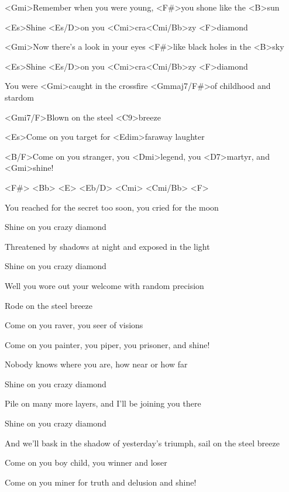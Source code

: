 

\zs
<Gmi>Remember when you were young,
<F#>you shone like the <B>sun

<Es>Shine <Es/D>on you <Cmi>cra<Cmi/Bb>zy <F>diamond

<Gmi>Now there's a look in your eyes
<F#>like black holes in the <B>sky

<Es>Shine <Es/D>on you <Cmi>cra<Cmi/Bb>zy <F>diamond

You were <Gmi>caught in the crossfire
<Gmmaj7/F#>of childhood and stardom

<Gmi7/F>Blown on the steel <C9>breeze

<Es>Come on you target for <Edim>faraway laughter

<B/F>Come on you stranger, you <Dmi>legend, you <D7>martyr, and <Gmi>shine!
\ks

<F#> <Bb> <E> <Eb/D> <Cmi> <Cmi/Bb> <F>

\zs
You reached for the secret too soon,
you cried for the moon

Shine on you crazy diamond

Threatened by shadows at night
and exposed in the light

Shine on you crazy diamond

Well you wore out your welcome
with random precision

Rode on the steel breeze

Come on you raver, you seer of visions

Come on you painter, you piper, you prisoner, and shine!
\ks

\zs
Nobody knows where you are,
how near or how far

Shine on you crazy diamond

Pile on many more layers,
and I'll be joining you there

Shine on you crazy diamond

And we'll bask in the shadow of yesterday's triumph,
sail on the steel breeze

Come on you boy child, you winner and loser

Come on you miner for truth and delusion and shine!
\ks

\kp
